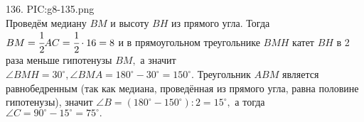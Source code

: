 136. {{PIC:g8-135.png}}\\
Проведём медиану $BM$ и высоту $BH$ из прямого угла. Тогда $BM=\cfrac{1}{2}AC=\cfrac{1}{2}\cdot16=8$ и в прямоугольном треугольнике $BMH$ катет $BH$ в 2 раза меньше гипотенузы $BM,$ а значит $\angle BMH=30^\circ, \angle BMA=180^\circ-30^\circ=150^\circ.$ Треугольник $ABM$ является равнобедренным (так как медиана, проведённая из прямого угла, равна половине гипотенузы), значит $\angle B=(180^\circ-150^\circ):2=15^\circ,$ а тогда $\angle C=90^\circ-15^\circ=75^\circ.$\\
